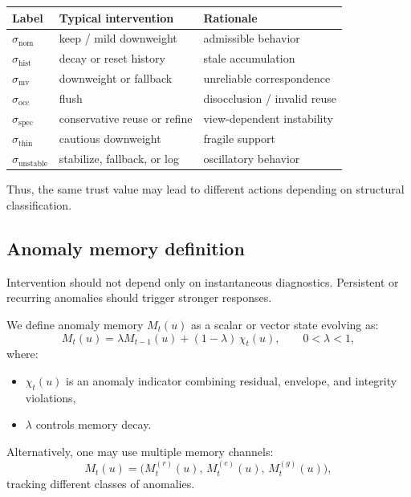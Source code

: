 \documentclass[11pt,letterpaper]{article}
\theoremstyle{gcresult}
\theoremstyle{definition}
\begin{document}
\begin{center}
\begin{tabular}{lll}
\toprule
Label & Typical intervention & Rationale \\
\midrule
$\sigma_{\mathrm{nom}}$ & keep / mild downweight & admissible behavior \\
$\sigma_{\mathrm{hist}}$ & decay or reset history & stale accumulation \\
$\sigma_{\mathrm{mv}}$ & downweight or fallback & unreliable correspondence \\
$\sigma_{\mathrm{occ}}$ & flush & disocclusion / invalid reuse \\
$\sigma_{\mathrm{spec}}$ & conservative reuse or refine & view-dependent instability \\
$\sigma_{\mathrm{thin}}$ & cautious downweight & fragile support \\
$\sigma_{\mathrm{unstable}}$ & stabilize, fallback, or log & oscillatory behavior \\
\bottomrule
\end{tabular}
\end{center}

Thus, the same trust value may lead to different actions depending on structural classification.


\subsection{Anomaly memory definition}

Intervention should not depend only on instantaneous diagnostics. Persistent or recurring anomalies should trigger stronger responses.

We define anomaly memory $M_t(u)$ as a scalar or vector state evolving as:
\begin{equation}
M_t(u)=\lambda M_{t-1}(u) + (1-\lambda)\,\chi_t(u),
\qquad 0<\lambda<1,
\end{equation}
where:
\begin{itemize}[leftmargin=1.5em]
    \item $\chi_t(u)$ is an anomaly indicator combining residual, envelope, and integrity violations,
    \item $\lambda$ controls memory decay.
\end{itemize}

Alternatively, one may use multiple memory channels:
\begin{equation}
M_t(u)=\bigl(M^{(r)}_t(u),\,M^{(e)}_t(u),\,M^{(g)}_t(u)\bigr),
\end{equation}
tracking different classes of anomalies.
\end{document}
